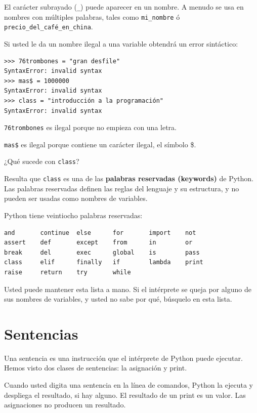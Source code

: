 El carácter subrayado (\texttt{\_}) puede aparecer en un nombre. A menudo
se usa en nombres con múltiples palabras, tales como 
\texttt{mi\_nombre} ó \texttt{precio\_del\_café\_en\_china}.


Si usted le da un nombre ilegal a una variable obtendrá un error sintáctico:

\beforeverb
\begin{verbatim}
>>> 76trombones = "gran desfile"
SyntaxError: invalid syntax
>>> mas$ = 1000000
SyntaxError: invalid syntax
>>> class = "introducción a la programación"
SyntaxError: invalid syntax
\end{verbatim}
\afterverb
%
\texttt{76trombones} es ilegal porque no empieza con una letra.

\texttt{mas\$} es ilegal porque contiene un  carácter ilegal, el símbolo \$. 

¿Qué sucede con \texttt{class}?

Resulta que \texttt{class} es una de las {\bf palabras reservadas (keywords)} de Python.
Las palabras reservadas definen las reglas del lenguaje y su estructura, y no 
pueden ser usadas como nombres de variables.


Python tiene veintiocho palabras reservadas:

\beforeverb
\begin{verbatim}
and       continue  else      for       import    not       
assert    def       except    from      in        or        
break     del       exec      global    is        pass      
class     elif      finally   if        lambda    print     
raise     return    try       while
\end{verbatim}
\afterverb
%
Usted puede mantener esta lista a mano. Si el intérprete se queja 
por alguno de sus nombres de variables, y usted no sabe por qué,
búsquelo en esta lista.


\section{Sentencias}

Una sentencia es una instrucción que el intérprete de Python puede
ejecutar. Hemos visto dos clases de sentencias: la asignación y print.

Cuando usted digita una sentencia en la línea de comandos, Python la
ejecuta y despliega el resultado, si hay alguno. El resultado de un 
print es un valor. Las asignaciones no producen un resultado.

